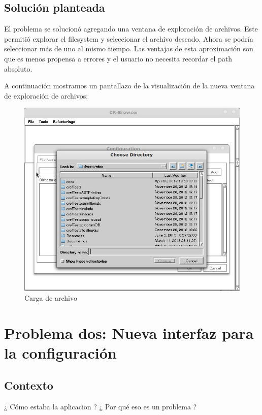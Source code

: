 \documentclass[a4paper,oneside,10pt]{article}
\begin{document}
\subsection{Soluci\'on planteada}
El problema se solucion\'o agregando una ventana de exploraci\'on de archivos. Este permitió explorar el filesystem y seleccionar el archivo deseado. Ahora se podría seleccionar m\'as de uno al mismo tiempo.
Las ventajas de esta aproximaci\'on son que es menos propensa a errores y el usuario no necesita recordar el path absoluto.

A continuaci\'on mostramos un pantallazo de la visualizaci\'on de la nueva ventana de exploraci\'on de archivos:

\begin{figure}[h!]
  \centering
    \includegraphics[scale=0.50]{images/codigo_modificado/seleccionar_directorio.jpg}
     \caption{Carga de archivo}
\end{figure}

\section{Problema dos: Nueva interfaz para la configuraci\'on}

\subsection{Contexto}
¿ C\'omo estaba la aplicacion ? ¿ Por qu\'e eso es un problema ?
\end{document}
